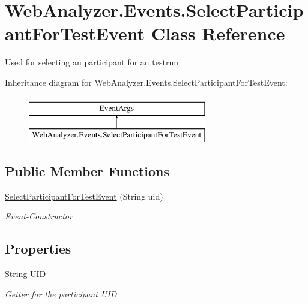 \hypertarget{class_web_analyzer_1_1_events_1_1_select_participant_for_test_event}{}\section{Web\+Analyzer.\+Events.\+Select\+Participant\+For\+Test\+Event Class Reference}
\label{class_web_analyzer_1_1_events_1_1_select_participant_for_test_event}


Used for selecting an participant for an testrun  


Inheritance diagram for Web\+Analyzer.\+Events.\+Select\+Participant\+For\+Test\+Event\+:\begin{figure}[H]
\begin{center}
\leavevmode
\includegraphics[height=2.000000cm]{class_web_analyzer_1_1_events_1_1_select_participant_for_test_event}
\end{center}
\end{figure}
\subsection*{Public Member Functions}
\begin{DoxyCompactItemize}
\item 
\hyperlink{class_web_analyzer_1_1_events_1_1_select_participant_for_test_event_acceeb9da0733201e24b579832bc8fdf5}{Select\+Participant\+For\+Test\+Event} (String uid)
\begin{DoxyCompactList}\small\item\em Event-\/\+Constructor \end{DoxyCompactList}\end{DoxyCompactItemize}
\subsection*{Properties}
\begin{DoxyCompactItemize}
\item 
String \hyperlink{class_web_analyzer_1_1_events_1_1_select_participant_for_test_event_a1749346fd01c6ff1a5561aa99d797dcc}{U\+I\+D}
\begin{DoxyCompactList}\small\item\em Getter for the participant U\+I\+D \end{DoxyCompactList}\end{DoxyCompactItemize}
